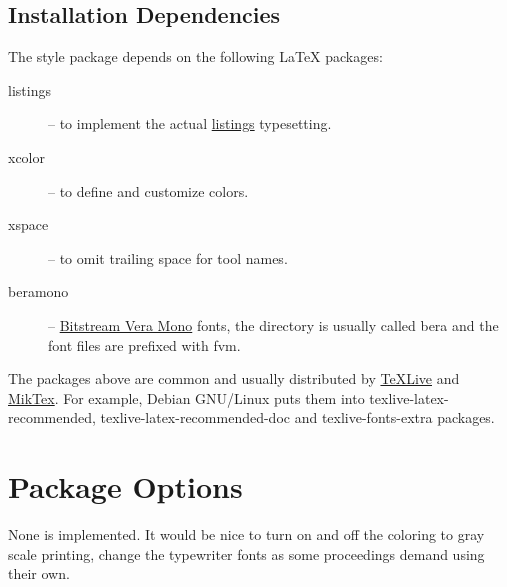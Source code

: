 \documentclass[english,paper=a4,final]{article}
\begin{document}
\subsection{Installation Dependencies}
The style package depends on the following \LaTeX{} packages:
\begin{description}
\item[listings] -- to implement the actual \href{https://www.ctan.org/pkg/listings}{listings} typesetting.
\item[xcolor] -- to define and customize colors.
\item[xspace] -- to omit trailing space for tool names.
\item[beramono] -- \href{http://www.tug.dk/FontCatalogue/beramono/}{Bitstream Vera Mono} fonts, the directory is usually called {\ttfamily bera} and the font files are prefixed with {\ttfamily fvm}.
\end{description}
The packages above are common and usually distributed by \href{https://www.tug.org/texlive/}{TeXLive} and \href{https://miktex.org/}{MikTex}.
For example, Debian GNU/Linux puts them into {\ttfamily texlive-latex-recommended}, {\ttfamily texlive-latex-recommended-doc} and {\ttfamily texlive-fonts-extra} packages.


\section{Package Options}
None is implemented. It would be nice to turn on and off the coloring to gray scale printing, change the typewriter fonts as some proceedings demand using their own.
\end{document}
